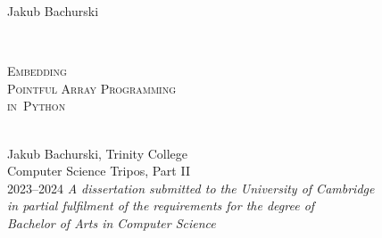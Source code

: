 \begin{titlepage}
  \hfill Jakub Bachurski
  \vspace*{5cm}
  \makeatletter
  \begin{center}
    \begin{Large}
        \textit{
            \@subtitle
        }
    \end{Large}\\[0.4cm]

    \begin{minipage}{13cm}
    \centering
    \Huge
        \textsc{
            Embedding \\[-0.2em]
            Pointful Array Programming \\[-0.2em]
            in~Python
        }
    \end{minipage}
    \\[1.5cm]

    Jakub Bachurski, Trinity College \\[0.25cm]
    Computer Science Tripos, Part II \\[0.25cm]
    2023--2024
    \vfill
    \textit{A dissertation submitted to the University of Cambridge \\ 
    in partial fulfilment
    of the requirements for the degree of \\ Bachelor of Arts in Computer Science}
  \end{center}
  \makeatother
\end{titlepage}

\newpage
